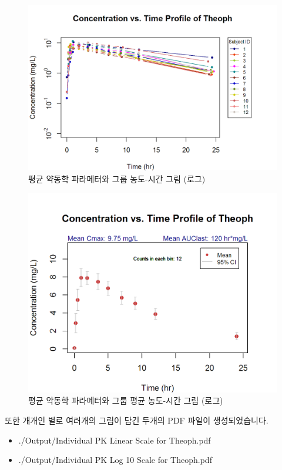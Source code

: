 \documentclass[12pt,]{krantz}
\providecommand{\tightlist}{%
  \setlength{\itemsep}{0pt}\setlength{\parskip}{0pt}}
\theoremstyle{definition}
\theoremstyle{definition}
\theoremstyle{definition}
\theoremstyle{remark}
\begin{document}
\begin{figure}
\includegraphics[width=1\linewidth]{Output/PK_Profile_Log_10_Scale_for_Theoph} \caption{평균 약동학 파라메터와 그룹 농도-시간 그림 (로그)}\label{fig:unnamed-chunk-34}
\end{figure}

\begin{figure}
\includegraphics[width=1\linewidth]{Output/PK_Profile_with_CI_for_Theoph} \caption{평균 약동학 파라메터와 그룹 평균 농도-시간 그림 (로그)}\label{fig:unnamed-chunk-35}
\end{figure}

또한 개개인 별로 여러개의 그림이 담긴 두개의 PDF 파일이 생성되었습니다.

\begin{itemize}
\tightlist
\item
  ./Output/Individual PK Linear Scale for Theoph.pdf
\item
  ./Output/Individual PK Log 10 Scale for Theoph.pdf
\end{itemize}
\end{document}
